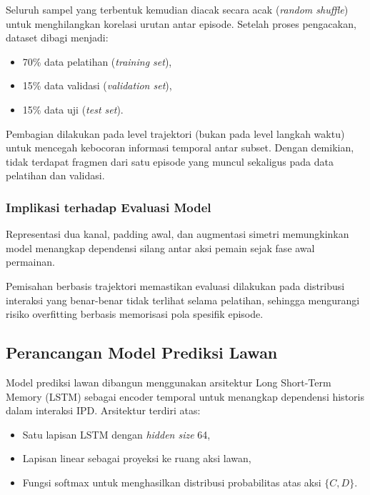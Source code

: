 Seluruh sampel yang terbentuk kemudian diacak secara acak (\textit{random shuffle}) untuk menghilangkan korelasi urutan antar episode. Setelah proses pengacakan, dataset dibagi menjadi:

\begin{itemize}
    \item 70\% data pelatihan (\textit{training set}),
    \item 15\% data validasi (\textit{validation set}),
    \item 15\% data uji (\textit{test set}).
\end{itemize}

Pembagian dilakukan pada level trajektori (bukan pada level langkah waktu) untuk mencegah kebocoran informasi temporal antar subset. Dengan demikian, tidak terdapat fragmen dari satu episode yang muncul sekaligus pada data pelatihan dan validasi.

\subsubsection{Implikasi terhadap Evaluasi Model}

Representasi dua kanal, padding awal, dan augmentasi simetri memungkinkan model menangkap dependensi silang antar aksi pemain sejak fase awal permainan. 

Pemisahan berbasis trajektori memastikan evaluasi dilakukan pada distribusi interaksi yang benar-benar tidak terlihat selama pelatihan, sehingga mengurangi risiko overfitting berbasis memorisasi pola spesifik episode.

\subsection{Perancangan Model Prediksi Lawan}

Model prediksi lawan dibangun menggunakan arsitektur Long Short-Term Memory (LSTM) sebagai encoder temporal untuk menangkap dependensi historis dalam interaksi IPD. Arsitektur terdiri atas:

\begin{itemize}
    \item Satu lapisan LSTM dengan \textit{hidden size} 64,
    \item Lapisan linear sebagai proyeksi ke ruang aksi lawan,
    \item Fungsi softmax untuk menghasilkan distribusi probabilitas atas aksi $\{C, D\}$.
\end{itemize}

